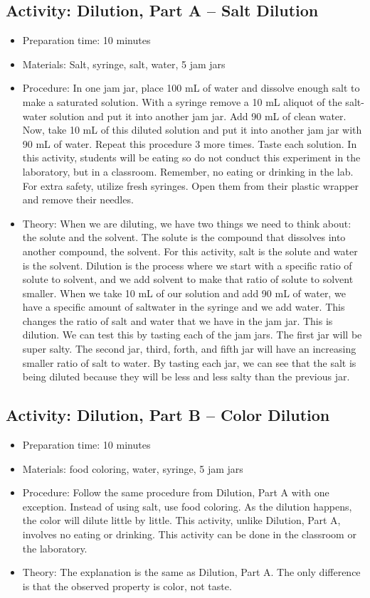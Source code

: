 \begin{itemize}
{\begin{itemize}
\subsection{Activity: Dilution, Part A – Salt Dilution}
\begin{itemize}
\item{Preparation time: 10 minutes}
\item{Materials: Salt, syringe, salt, water, 5 jam jars}
\item{Procedure: In one jam jar, place 100 mL of water and dissolve enough salt to make a saturated solution. With a syringe remove a 10 mL aliquot of the salt-water solution and put it into another jam jar. Add 90 mL of clean water. Now, take 10 mL of this diluted solution and put it into another jam jar with 90 mL of water. Repeat this procedure 3 more times. Taste each solution. In this activity, students will be eating so do not conduct this experiment in the laboratory, but in a classroom. Remember, no eating or drinking in the lab. For extra safety, utilize fresh syringes. Open them from their plastic wrapper and remove their needles.}
\item{Theory: When we are diluting, we have two things we need to think about: the solute and the solvent. The solute is the compound that dissolves into another compound, the solvent. For this activity, salt is the solute and water is the solvent. Dilution is the process where we start with a specific ratio of solute to solvent, and we add solvent to make that ratio of solute to solvent smaller. When we take 10 mL of our solution and add 90 mL of water, we have a specific amount of saltwater in the syringe and we add water. This changes the ratio of salt and water that we have in the jam jar. This is dilution. We can test this by tasting each of the jam jars. The first jar will be super salty. The second jar, third, forth, and fifth jar will have an increasing smaller ratio of salt to water. By tasting each jar, we can see that the salt is being diluted because they will be less and less salty than the previous jar.}
\end{itemize}

\subsection{Activity: Dilution, Part B – Color Dilution}
\begin{itemize}
\item{Preparation time: 10 minutes}
\item{Materials: food coloring, water, syringe, 5 jam jars}
\item{Procedure: Follow the same procedure from Dilution, Part A with one exception. Instead of using salt, use food coloring. As the dilution happens, the color will dilute little by little. This activity, unlike Dilution, Part A, involves no eating or drinking. This activity can be done in the classroom or the laboratory.}
\item{Theory: The explanation is the same as Dilution, Part A. The only difference is that the observed property is color, not taste.}
\end{itemize}


\end{itemize}}
\end{itemize}
